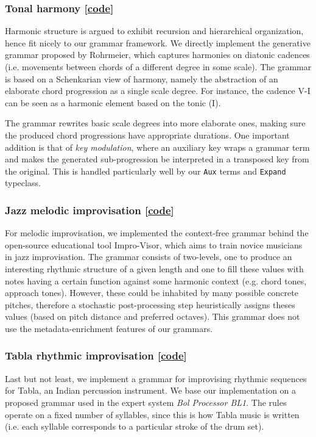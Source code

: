 \documentclass[11pt,a4paper]{article}
\newcommand{\icode}[1]{\texttt{#1}}
\begin{document}
\subsubsection{Tonal harmony [\href{https://github.com/omelkonian/AlgoRhythm/blob/master/AlgoRhythm/src/Grammar/TonalHarmony.hs}{code}]}
Harmonic structure is argued to exhibit recursion and hierarchical organization, hence fit nicely to our grammar framework. We directly implement the generative grammar proposed by Rohrmeier\cite{tonal}, which captures harmonies on diatonic cadences (i.e. movements between chords of a different degree in some scale). The grammar is based on a Schenkarian view of harmony\cite{schenker}, namely the abstraction of an elaborate chord progression as a single scale degree. For instance, the cadence V-I can be seen as a harmonic element based on the tonic (I).

The grammar rewrites basic scale degrees into more elaborate ones, making sure the produced chord progressions have appropriate durations. One important addition is that of \textit{key modulation}, where an auxiliary key wraps a grammar term and makes the generated sub-progression be interpreted in a transposed key from the original. This is handled particularly well by our \icode{Aux} terms and \icode{Expand} typeclass.

\subsubsection{Jazz melodic improvisation [\href{https://github.com/omelkonian/AlgoRhythm/blob/master/AlgoRhythm/src/Grammar/Melody.hs}{code}]}
For melodic improvisation, we implemented the context-free grammar behind the open-source educational tool Impro-Visor\cite{improvisor}, which aims to train novice musicians in jazz improvisation. The grammar consists of two-levels, one to produce an interesting rhythmic structure of a given length and one to fill these values with notes having a certain function against some harmonic context (e.g. chord tones, approach tones). However, these could be inhabited by many possible concrete pitches, therefore a stochastic post-processing step heuristically assigns theses values (based on pitch distance and preferred octaves). This grammar does not use the metadata-enrichment features of our grammars.

\subsubsection{Tabla rhythmic improvisation [\href{https://github.com/omelkonian/AlgoRhythm/blob/master/AlgoRhythm/src/Grammar/Tabla.hs}{code}]}
Last but not least, we implement a grammar for improvising rhythmic sequences for Tabla, an Indian percussion instrument. We base our implementation on a proposed grammar used in the expert system \textit{Bol Processor BL1}\cite{tabla}. The rules operate on a fixed number of syllables, since this is how Tabla music is written (i.e. each syllable corresponds to a particular stroke of the drum set).\vspace{-3mm}
\end{document}
